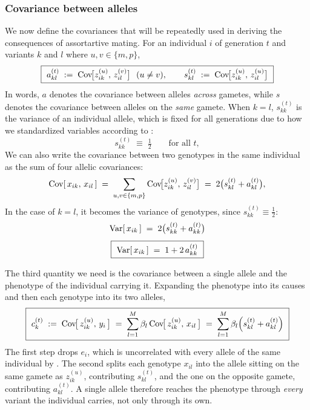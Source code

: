 \documentclass[12pt]{article}
\begin{document}
\subsubsection*{Covariance between alleles}
We now define the covariances that will be repeatedly used in deriving the consequences of assortartive mating.
For an individual $i$ of generation $t$ and variants $k$ and $l$ where $u,v \in \{m,p\}$,
\begin{equation}\label{eq:as-def}
    \boxed{\
    a^{(t)}_{kl} \;:=\; \Cov\!\big[z^{(u)}_{ik},\, z^{(v)}_{il}\big]\ \ (u \neq v),
    \qquad
    s^{(t)}_{kl} \;:=\; \Cov\!\big[z^{(u)}_{ik},\, z^{(u)}_{il}\big] \ }
\end{equation}
In words, $a$ denotes the covariance between alleles \emph{across} gametes, while $s$ denotes the covariance between alleles on the \emph{same} gamete.
When $k=l$, $s^{(t)}_{kk}$ is the variance of an individual allele, which is fixed for all generations due to how we standardized variables according to :
\begin{equation}\label{eq:skk}
    s^{(t)}_{kk} \;\equiv\; \tfrac12 \qquad \text{for all } t ,
\end{equation}
We can also write the covariance between two genotypes in the same individual as the sum of four allelic covariances:
\begin{equation}\label{eq:x-from-as}
    \mathrm{Cov}[\,x_{ik},\, x_{il}\,]
    \;=\; \sum_{u,v \in \{m,p\}} \mathrm{Cov}\!\big[z^{(u)}_{ik},\, z^{(v)}_{il}\big]
    \;=\; 2\big(s^{(t)}_{kl} + a^{(t)}_{kl}\big) ,
\end{equation}
In the case of $k=l$, it becomes the variance of genotypes, since $s^{(t)}_{kk} \equiv \tfrac12$:
\begin{equation}\label{eq:varx-a}
\begin{gathered}
    \mathrm{Var}[\,x_{ik}\,] \;=\; 2\big(s^{(t)}_{kk} + a^{(t)}_{kk}\big) \\[4pt]
    \boxed{\ \mathrm{Var}[\,x_{ik}\,] \;=\; 1 + 2\,a^{(t)}_{kk}\ }
\end{gathered}
\end{equation}

The third quantity we need is the covariance between a single allele and the phenotype of the individual carrying it.
Expanding the phenotype into its causes and then each genotype into its two alleles,
\begin{equation}\label{eq:c-def}
    \boxed{\ c^{(t)}_k \;:=\; \Cov\!\big[\,z^{(u)}_{ik},\, y_i\,\big]
    \;=\; \sum_{l=1}^{M} \beta_l\,\Cov\!\big[\,z^{(u)}_{ik},\, x_{il}\,\big]
    \;=\; \sum_{l=1}^{M} \beta_l\Big(s^{(t)}_{kl} + a^{(t)}_{kl}\Big) \ }
\end{equation}
The first step drops $e_i$, which is uncorrelated with every allele of the same individual by .
The second splits each genotype $x_{il}$ into the allele sitting on the same gamete as $z^{(u)}_{ik}$, contributing $s^{(t)}_{kl}$, and the one on the opposite gamete, contributing $a^{(t)}_{kl}$.
A single allele therefore reaches the phenotype through \emph{every} variant the individual carries, not only through its own.
\end{document}
